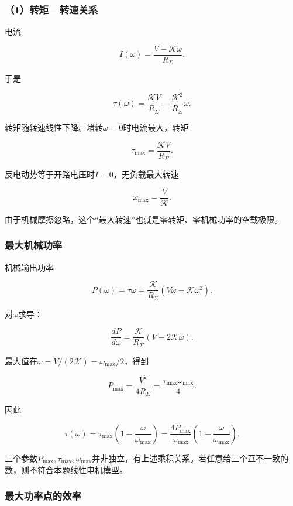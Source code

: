 \documentclass[12pt,a4paper,fontset=fandol]{ctexart}
\begin{document}
\subsubsection{（1）转矩---转速关系}\label{ux8f6cux77e9ux8f6cux901fux5173ux7cfb}

电流

\[
I(\omega)=\frac{V-\mathcal K\omega}{R_\Sigma}.
\]

于是

\[
\boxed{\tau(\omega)=\frac{\mathcal K V}{R_\Sigma}
-\frac{\mathcal K^2}{R_\Sigma}\omega}.
\]

转矩随转速线性下降。堵转\(\omega=0\)时电流最大，转矩

\[
\boxed{\tau_{\max}=\frac{\mathcal K V}{R_\Sigma}}.
\]

反电动势等于开路电压时\(I=0\)，无负载最大转速

\[
\boxed{\omega_{\max}=\frac V{\mathcal K}}.
\]

由于机械摩擦忽略，这个``最大转速''也就是零转矩、零机械功率的空载极限。

\subsubsection{最大机械功率}\label{ux6700ux5927ux673aux68b0ux529fux7387}

机械输出功率

\[
P(\omega)=\tau\omega
=\frac{\mathcal K}{R_\Sigma}
(V\omega-\mathcal K\omega^2).
\]

对\(\omega\)求导：

\[
\frac{dP}{d\omega}
=\frac{\mathcal K}{R_\Sigma}(V-2\mathcal K\omega).
\]

最大值在\(\omega=V/(2\mathcal K)=\omega_{\max}/2\)，得到

\[
\boxed{P_{\max}=\frac{V^2}{4R_\Sigma}
=\frac{\tau_{\max}\omega_{\max}}4}.
\]

因此

\[
\boxed{
\tau(\omega)=\tau_{\max}
\left(1-\frac\omega{\omega_{\max}}\right)
=\frac{4P_{\max}}{\omega_{\max}}
\left(1-\frac\omega{\omega_{\max}}\right)}.
\]

三个参数\(P_{\max},\tau_{\max},\omega_{\max}\)并非独立，有上述乘积关系。若任意给三个互不一致的数，则不符合本题线性电机模型。

\subsubsection{最大功率点的效率}\label{ux6700ux5927ux529fux7387ux70b9ux7684ux6548ux7387}
\end{document}

